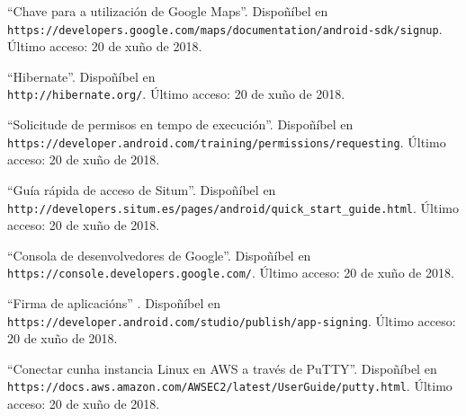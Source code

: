 \documentclass[11pt, a4paper, twoside, titlepage]{book}
\begin{document}
\begin{thebibliography}{9}
	``Chave para a utilización de Google Maps''. Dispoñíbel en \\\texttt{https://developers.google.com/maps/documentation/android-sdk/signup}. Último acceso: 20 de xuño de 2018.
	
	``Hibernate''. Dispoñíbel en \\\texttt{http://hibernate.org/}. Último acceso: 20 de xuño de 2018.
	
	``Solicitude de permisos en tempo de execución''. Dispoñíbel en \\\texttt{https://developer.android.com/training/permissions/requesting}. Último acceso: 20 de xuño de 2018.
	
	``Guía rápida de acceso de Situm''. Dispoñíbel en \\\texttt{http://developers.situm.es/pages/android/quick\_start\_guide.html}. Último acceso: 20 de xuño de 2018.
	
	``Consola de desenvolvedores de Google''. Dispoñíbel en \\\texttt{https://console.developers.google.com/}. Último acceso: 20 de xuño de 2018.
	
	``Firma de aplicacións'' . Dispoñíbel en \\\texttt{https://developer.android.com/studio/publish/app-signing}. Último acceso: 20 de xuño de 2018.
	
	``Conectar cunha instancia Linux en AWS a través de PuTTY''. Dispoñíbel en \\\texttt{https://docs.aws.amazon.com/AWSEC2/latest/UserGuide/putty.html}. Último acceso: 20 de xuño de 2018.
	
\end{thebibliography}
\end{document}
